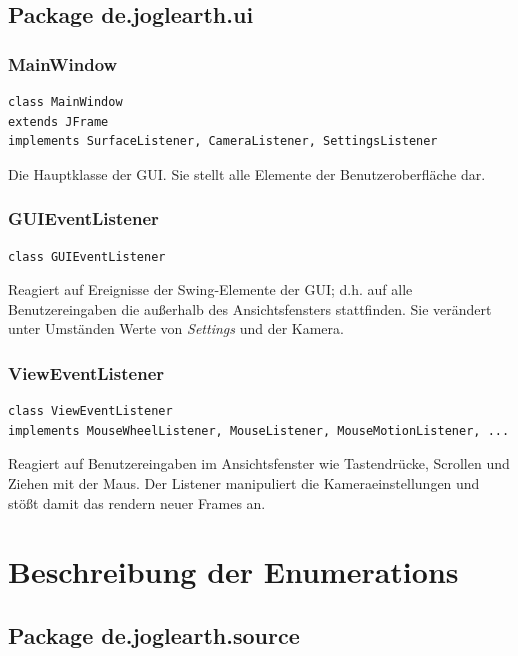 \documentclass[10pt]{scrreprt}
\begin{document}
\vspace{5mm}
\section{Package de.joglearth.ui}
\subsection*{MainWindow}
\begin{lstlisting}
class MainWindow
extends JFrame
implements SurfaceListener, CameraListener, SettingsListener
\end{lstlisting}
Die Hauptklasse der GUI. Sie stellt alle Elemente der Benutzeroberfläche dar.

\vspace{5mm}
\subsection*{GUIEventListener}
\begin{lstlisting}
class GUIEventListener
\end{lstlisting}
Reagiert auf Ereignisse der Swing-Elemente der GUI; d.h. auf alle Benutzereingaben die außerhalb des Ansichtsfensters stattfinden. Sie verändert unter Umständen Werte von \textit{Settings} und der Kamera.\\

\vspace{5mm}
\subsection*{ViewEventListener}
\begin{lstlisting}
class ViewEventListener
implements MouseWheelListener, MouseListener, MouseMotionListener, ...
\end{lstlisting}
Reagiert auf Benutzereingaben im Ansichtsfenster wie Tastendrücke, Scrollen und Ziehen mit der Maus. Der Listener manipuliert die Kameraeinstellungen und stößt damit das rendern neuer Frames an.



\chapter{Beschreibung der Enumerations}
\section*{Package de.joglearth.source}
\end{document}
